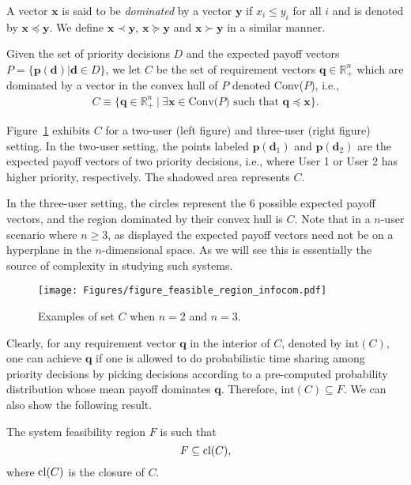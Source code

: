 \documentclass[prodmode,acmtompecs]{acmsmall}
\newcommand{\reqvec}{\mathbf{q}}
\newcommand{\feasibilityRegion}{F}
\newcommand{\myComments}[1]{}
\newif\ifdissertation
\newcommand{\dissertationStart}{\ifdissertation  \myComments{Dissertation version: }}
\newcommand{\commentEnd}{\myComments{End}}
\begin{document}
A vector $\mathbf{x}$ is said to be {\em dominated} by a vector $\mathbf{y}$ if $x_i \leq y_i$ for all $i$ and is denoted by $\mathbf{x} \preceq \mathbf{y}$. We define $\mathbf{x} \prec \mathbf{y}$, $\mathbf{x} \succeq \mathbf{y}$ and $\mathbf{x} \succ \mathbf{y}$ in a similar manner. 

Given the set of priority decisions $D$ and the expected payoff vectors $P = \{\mathbf{p}(\mathbf{d}) | \mathbf{d} \in D \}$, we let $C$ be the set of requirement vectors $\reqvec \in \mathbb R^n_{+}$ which are dominated by a vector in the convex hull of $P$ denoted Conv($P$), i.e., 
\begin{align}
\label{align_C}
C \equiv \{ \reqvec \in \mathbb R^n_{+} ~|~ \exists \mathbf{x} \in \text{Conv($P$)} \text{ such that } \reqvec \preceq \mathbf{x} \}. 
\end{align}

Figure~{\ref{fig_feasible_region}} exhibits $C$ for a two-user (left figure) and three-user (right figure) setting. 
In the two-user setting, the points labeled $\mathbf{p}(\mathbf{d}_1)$ and $\mathbf{p}(\mathbf{d}_2)$ are the expected payoff vectors of two priority decisions, i.e., where User 1 or User 2 has higher priority, respectively. The shadowed area represents $C$. 
\dissertationStart
Clearly these two expected payoff vectors are always on a line. 
\commentEnd\fi
In the three-user setting, the circles represent the $6$ possible expected payoff vectors, and the region dominated by their convex hull is $C$. 
Note that in a $n$-user scenario where $n\geq 3$, as displayed the expected payoff vectors need not be on a hyperplane in the $n$-dimensional space. 
As we will see this is essentially the source of complexity in studying such systems. 

\begin{figure}[htp]
  \centering
  \texttt{[image: Figures/figure\_feasible\_region\_infocom.pdf]}
  \caption{Examples of set $C$ when $n=2$ and $n=3$. }
  \label{fig_feasible_region}
\end{figure}

Clearly, for any requirement vector $\reqvec$ in the interior of $C$, denoted by $\text{int}(C)$, one can achieve $\reqvec$ if one is allowed to do probabilistic time sharing among priority decisions by picking decisions according to a pre-computed probability distribution whose mean payoff dominates $\reqvec$. Therefore, $\text{int}(C) \subseteq \feasibilityRegion$. We can also show the following result. 

\begin{lemma}
\label{lemma_R_in_close_C}
The system feasibility region $F$ is such that
$$
\feasibilityRegion \subseteq \textnormal{cl}(C), 
$$
where $\textnormal{cl}(C)$ is the closure of $C$. 
\end{lemma}
\end{document}
